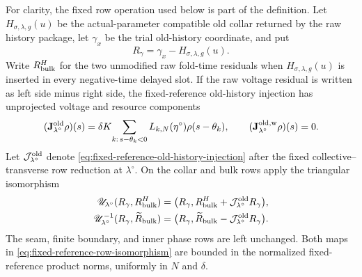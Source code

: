 \begin{lemma}
For clarity, the fixed row operation used below is part of the definition.
Let $H_{\sigma,\lambda,g}(u)$ be the actual-parameter compatible old
collar returned by the raw history package, let $\gamma_x$ be the trial
old-history coordinate, and put
\begin{equation}
 R_\gamma=\gamma_x-H_{\sigma,\lambda,g}(u).       \label{eq:fixed-reference-collar-mismatch}
\end{equation}
Write $R_{\rm bulk}^{H}$ for the two unmodified raw fold-time residuals
when $H_{\sigma,\lambda,g}(u)$ is inserted in every negative-time delayed
slot.  If the raw voltage residual is written as left side minus right
side, the fixed-reference old-history injection has unprojected voltage
and resource components
\begin{equation}
 (\mathbf J_{\lambda^\circ}^{\rm old}\rho)(s)
 =\delta K\!\sum_{k:\,s-\theta_k<0}
       L_{k,N}(\eta^\circ)\rho(s-\theta_k),
 \qquad
 (\mathbf J_{\lambda^\circ}^{\rm old,w}\rho)(s)=0. \label{eq:fixed-reference-old-history-injection}
\end{equation}
Let $\mathcal J_{\lambda^\circ}^{\rm old}$ denote
\cref{eq:fixed-reference-old-history-injection} after the fixed
collective--transverse row reduction at $\lambda^\circ$.  On the collar
and bulk rows apply the triangular isomorphism
\begin{align}
 \mathscr U_{\lambda^\circ}(R_\gamma,R_{\rm bulk}^{H})
 &=\bigl(R_\gamma,
       R_{\rm bulk}^{H}+\mathcal J_{\lambda^\circ}^{\rm old}R_\gamma\bigr),
                                                        \notag\\
 \mathscr U_{\lambda^\circ}^{-1}(R_\gamma,\widetilde R_{\rm bulk})
 &=\bigl(R_\gamma,
       \widetilde R_{\rm bulk}
          -\mathcal J_{\lambda^\circ}^{\rm old}R_\gamma\bigr).
                                                        \label{eq:fixed-reference-row-isomorphism}
\end{align}
The seam, finite boundary, and inner phase rows are left unchanged.
Both maps in \cref{eq:fixed-reference-row-isomorphism} are bounded in the
normalized fixed-reference product norms, uniformly in $N$ and $\delta$.


\end{lemma}
